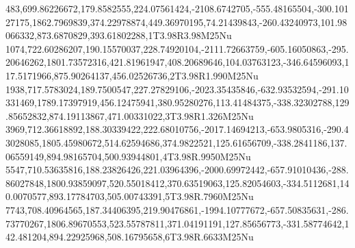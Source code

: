 483,699.86226672,179.8582555,224.07561424,-2108.6742705,-555.48165504,-300.10127175,1862.7969839,374.22978874,449.36970195,74.21439843,-260.43240973,101.98066332,873.6870829,393.61802288,1T3.98R3.98M25Nu
1074,722.60286207,190.15570037,228.74920104,-2111.72663759,-605.16050863,-295.20646262,1801.73572316,421.81961947,408.20689646,104.03763123,-346.64596093,117.5171966,875.90264137,456.02526736,2T3.98R1.990M25Nu
1938,717.5783024,189.7500547,227.27829106,-2023.35435846,-632.93532594,-291.10331469,1789.17397919,456.12475941,380.95280276,113.41484375,-338.32302788,129.85652832,874.19113867,471.00331022,3T3.98R1.326M25Nu
3969,712.36618892,188.30339422,222.68010756,-2017.14694213,-653.9805316,-290.43028085,1805.45980672,514.62594686,374.9822521,125.61656709,-338.2841186,137.06559149,894.98165704,500.93944801,4T3.98R.9950M25Nu
5547,710.53635816,188.23826426,221.03964396,-2000.69972442,-657.91010436,-288.86027848,1800.93859097,520.55018412,370.63519063,125.82054603,-334.5112681,140.0070577,893.17784703,505.00743391,5T3.98R.7960M25Nu
7743,708.40964565,187.34406395,219.90476861,-1994.10777672,-657.50835631,-286.73770267,1806.89670553,523.55787811,371.04191191,127.85656773,-331.58774642,142.481204,894.22925968,508.16795658,6T3.98R.6633M25Nu
